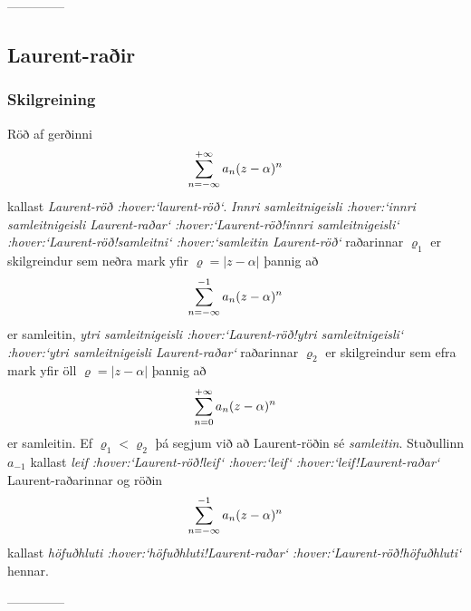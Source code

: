 --------------



\subsection*{Laurent-raðir}

\subsubsection{Skilgreining}
Röð af gerðinni 
 $$\sum_{n=-\infty}\sp{+\infty}a_n(z-\alpha)\sp n
 $$
kallast {\it Laurent-röð :hover:`laurent-röð`}.  {\it Innri samleitnigeisli
 :hover:`innri samleitnigeisli Laurent-raðar` :hover:`Laurent-röð!innri
samleitnigeisli` :hover:`Laurent-röð!samleitni` :hover:`samleitin Laurent-röð`}
raðarinnar $\varrho_1$ er skilgreindur sem neðra mark yfir
$\varrho=|z-\alpha|$ þannig að
$$ \sum_{n=-\infty}\sp{-1} a_n(z-{\alpha})\sp n $$
er samleitin, {\it ytri samleitnigeisli :hover:`Laurent-röð!ytri
samleitnigeisli` :hover:`ytri samleitnigeisli Laurent-raðar`} raðarinnar
$\varrho_2$ er skilgreindur sem efra mark yfir öll $\varrho=|z-\alpha|$
þannig að
$$ \sum_{n=0}\sp{+\infty}a_n(z-{\alpha})\sp n $$
er samleitin. 
Ef $\varrho_1<\varrho_2$ þá segjum við að Laurent-röðin
sé {\it samleitin}.    Stuðullinn $a_{-1}$ kallast {\it
leif :hover:`Laurent-röð!leif` :hover:`leif` :hover:`leif!Laurent-raðar`}
Laurent-raðarinnar 
og röðin 
$$\sum_{n=-\infty}\sp{-1}a_n(z-{\alpha})\sp n
$$ 
kallast {\it
höfuðhluti :hover:`höfuðhluti!Laurent-raðar` :hover:`Laurent-röð!höfuðhluti`}
hennar.


--------------




